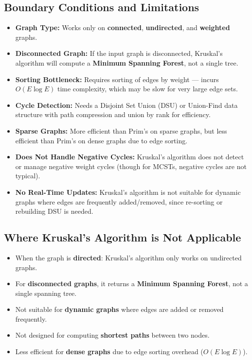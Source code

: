 \documentclass[a4paper,14pt]{extarticle}
\begin{document}
\newpage
\subsection{Boundary Conditions and Limitations}

\begin{itemize}
    \item \textbf{Graph Type:} Works only on \textbf{connected}, \textbf{undirected}, and \textbf{weighted} graphs.
    \item \textbf{Disconnected Graph:} If the input graph is disconnected, Kruskal’s algorithm will compute a \textbf{Minimum Spanning Forest}, not a single tree.
    \item \textbf{Sorting Bottleneck:} Requires sorting of edges by weight — incurs $O(E \log E)$ time complexity, which may be slow for very large edge sets.
    \item \textbf{Cycle Detection:} Needs a Disjoint Set Union (DSU) or Union-Find data structure with path compression and union by rank for efficiency.
    \item \textbf{Sparse Graphs:} More efficient than Prim’s on sparse graphs, but less efficient than Prim’s on dense graphs due to edge sorting.
    \item \textbf{Does Not Handle Negative Cycles:} Kruskal’s algorithm does not detect or manage negative weight cycles (though for MCSTs, negative cycles are not typical).
    \item \textbf{No Real-Time Updates:} Kruskal’s algorithm is not suitable for dynamic graphs where edges are frequently added/removed, since re-sorting or rebuilding DSU is needed.
\end{itemize}

\subsection{Where Kruskal's Algorithm is Not Applicable}

\begin{itemize}
    \item When the graph is \textbf{directed}: Kruskal's algorithm only works on undirected graphs.
    \item For \textbf{disconnected graphs}, it returns a \textbf{Minimum Spanning Forest}, not a single spanning tree.
    \item Not suitable for \textbf{dynamic graphs} where edges are added or removed frequently.
    \item Not designed for computing \textbf{shortest paths} between two nodes.
    \item Less efficient for \textbf{dense graphs} due to edge sorting overhead ($O(E \log E)$).
\end{itemize}
\end{document}
